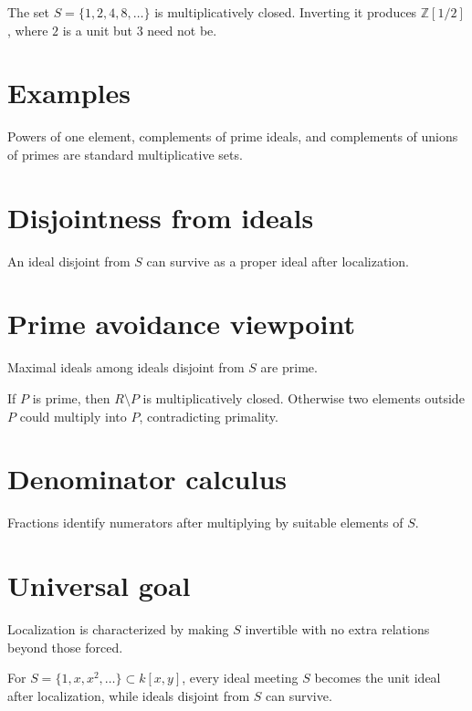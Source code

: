 \begin{example}\label{ex:v05-expand-01}
The set $S=\{1,2,4,8,\ldots\}$ is multiplicatively closed. Inverting it produces $\mathbb Z[1/2]$, where $2$ is a unit but $3$ need not be.
\end{example}
\section{Examples}
Powers of one element, complements of prime ideals, and complements of unions of primes are standard multiplicative sets.

\section{Disjointness from ideals}
An ideal disjoint from $S$ can survive as a proper ideal after localization.

\section{Prime avoidance viewpoint}
Maximal ideals among ideals disjoint from $S$ are prime.

\begin{example}\label{ex:v05-expand-02}
If $P$ is prime, then $R\setminus P$ is multiplicatively closed. Otherwise two elements outside $P$ could multiply into $P$, contradicting primality.
\end{example}
\section{Denominator calculus}
Fractions identify numerators after multiplying by suitable elements of $S$.

\section{Universal goal}
Localization is characterized by making $S$ invertible with no extra relations beyond those forced.

\begin{example}\label{ex:v05-expand-03}
For $S=\{1,x,x^2,\ldots\}\subset k[x,y]$, every ideal meeting $S$ becomes the unit ideal after localization, while ideals disjoint from $S$ can survive.
\end{example}
